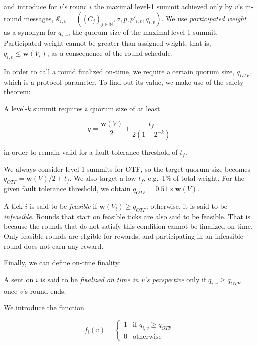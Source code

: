 and introduce for $v$'s round $i$ the maximal level-1 summit achieved only by $v$'s in-round messages, $\mathcal{S}_{i,v}=((C_j)_{j\in\mathbb{N}}, \sigma,p,p'_{i,v},q_{i,v})$. We use \emph{participated weight} as a synonym for $q_{i,v}$, the quorum size of the maximal level-1 summit. Participated weight cannot be greater than assigned weight, that is, $q_{i,v} \leq \boldsymbol{w}(V_i)$, as a consequence of the round schedule.

In order to call a round finalized on-time, we require a certain quorum size, $q_{OTF}$, which is a protocol parameter. To find out its value, we make use of the safety theorem:

\begin{theorem}
  A level-$k$ summit requires a quorum size of at least

  \begin{equation}
    q = \frac{\boldsymbol{w}(V)}{2} + \frac{t_f}{2(1-2^{-k})}
  \end{equation}

  in order to remain valid for a fault tolerance threshold of $t_f$.
\end{theorem}

We always consider level-1 summits for OTF, so the target quorum size becomes $q_{OTF}=\boldsymbol{w}(V)/2+t_f$. We also target a low $t_f$, e.g.~1\% of total weight. For the given fault tolerance threshold, we obtain $q_{OTF} = 0.51 \times \boldsymbol{w}(V)$.

A tick $i$ is said to be \emph{feasible} if $\boldsymbol{w}(V_i)\geq q_{OTF}$; otherwise, it is said to be \emph{infeasible}. Rounds that start on feasible ticks are also said to be feasible. That is because the rounds that do not satisfy this condition cannot be finalized on time. Only feasible rounds are eligible for rewards, and participating in an infeasible round does not earn any reward.

Finally, we can define on-time finality:

\begin{definition}
  A \PROP sent on $i$ is said to be \emph{finalized on time in $v$'s perspective} only if $q_{i,v} \geq q_{OTF}$ once $v$'s round ends.
\end{definition}

We introduce the function

\begin{equation}
  f_i(v) =
  \begin{cases}
    1 & \text{if } q_{i,v} \geq q_{OTF} \\
    0 & \text{otherwise}
  \end{cases}
\end{equation}

